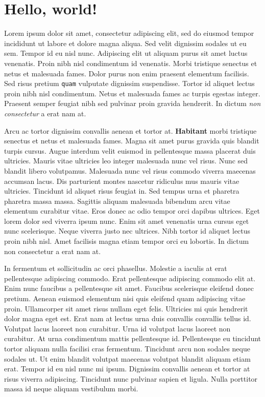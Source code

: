\documentclass{article}
\begin{document}
\section*{Hello, world!}

Lorem ipsum dolor sit amet, consectetur adipiscing elit, sed do eiusmod tempor
incididunt ut labore et dolore magna aliqua. Sed velit dignissim sodales ut eu
sem. Tempor id eu nisl nunc. Adipiscing elit ut aliquam purus sit amet luctus
venenatis. Proin nibh nisl condimentum id venenatis. Morbi tristique senectus
et netus et malesuada fames. Dolor purus non enim praesent elementum facilisis.
Sed risus pretium {\tt quam} vulputate dignissim suspendisse. Tortor id aliquet
lectus proin nibh nisl condimentum. Netus et malesuada fames ac turpis egestas
integer. Praesent semper feugiat nibh sed pulvinar proin gravida hendrerit. In
dictum \textit{non consectetur} a erat nam at.

Arcu ac tortor dignissim convallis aenean et tortor at. \textbf{Habitant} morbi
tristique senectus et netus et malesuada fames. Magna sit amet purus gravida
quis blandit turpis cursus. Augue interdum velit euismod in pellentesque massa
placerat duis ultricies. Mauris vitae ultricies leo integer malesuada nunc vel
risus. Nunc sed blandit libero volutpamus. Malesuada nunc vel risus commodo
viverra maecenas accumsan lacus. Dis parturient montes nascetur ridiculus mus
mauris vitae ultricies. Tincidunt id aliquet risus feugiat in. Sed tempus urna
et pharetra pharetra massa massa. Sagittis aliquam malesuada bibendum arcu
vitae elementum curabitur vitae. Eros donec ac odio tempor orci dapibus
ultrices. Eget lorem dolor sed viverra ipsum nunc. Enim sit amet venenatis urna
cursus eget nunc scelerisque. Neque viverra justo nec ultrices. Nibh tortor id
aliquet lectus proin nibh nisl. Amet facilisis magna etiam tempor orci eu
lobortis. In dictum non consectetur a erat nam at.

\vspace{20mm}

In fermentum et sollicitudin ac orci phasellus. Molestie a iaculis at erat
pellentesque adipiscing commodo. Erat pellentesque adipiscing commodo elit at.
Enim nunc faucibus a pellentesque sit amet. Faucibus scelerisque eleifend donec
pretium. Aenean euismod elementum nisi quis eleifend quam adipiscing vitae
proin. Ullamcorper sit amet risus nullam eget felis. Ultricies mi quis
hendrerit dolor magna eget est. Erat nam at lectus urna duis convallis
convallis tellus id. Volutpat lacus laoreet non curabitur. Urna id volutpat
lacus laoreet non curabitur. At urna condimentum mattis pellentesque id.
Pellentesque eu tincidunt tortor aliquam nulla facilisi cras fermentum.
Tincidunt arcu non sodales neque sodales ut. Ut enim blandit volutpat maecenas
volutpat blandit aliquam etiam erat. Tempor id eu nisl nunc mi ipsum. Dignissim
convallis aenean et tortor at risus viverra adipiscing. Tincidunt nunc pulvinar
sapien et ligula. Nulla porttitor massa id neque aliquam vestibulum morbi.
\end{document}

